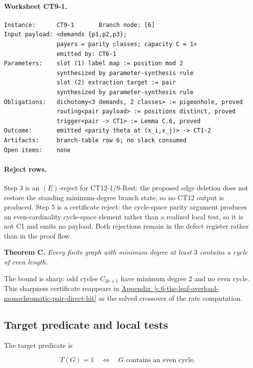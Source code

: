 \documentclass[
  11pt,
]{article}
\theoremstyle{definition}
\newcommand{\appref}[1]{\hyperref[#1]{Appendix~\ref*{#1}}}
\begin{document}
\paragraph{Worksheet CT9-1.}
\begingroup
\small
\begin{verbatim}
Instance:      CT9-1       Branch node: [6]
Input payload: <demands {p1,p2,p3};
               payers = parity classes; capacity C = 1>
               emitted by: CT6-1
Parameters:    slot (1) label map := position mod 2
               synthesized by parameter-synthesis rule
               slot (2) extraction target := pair
               synthesized by parameter-synthesis rule
Obligations:   dichotomy<3 demands, 2 classes> := pigeonhole, proved
               routing<pair payload> := positions distinct, proved
               trigger<pair -> CT1> := Lemma C.6, proved
Outcome:       emitted <parity theta at (x_i,x_j)> -> CT1-2
Artifacts:     branch-table row 6; no slack consumed
Open items:    none
\end{verbatim}
\endgroup

\paragraph{Reject rows.}
Step 3 is an \((E)\)-reject for CT12-1/S-Rest: the proposed edge deletion
does not restore the standing minimum-degree branch state, so no CT12
output is produced. Step 5 is a certificate reject: the cycle-space
parity argument produces an even-cardinality cycle-space element rather
than a realized local test, so it is not C1 and emits no payload. Both
rejections remain in the defect register rather than in the proof flow.

\textbf{Theorem C.} \emph{Every finite graph with minimum degree at
least \(3\) contains a cycle of even length.}

The bound is sharp: odd cycles \(C_{2k+1}\) have minimum degree \(2\)
and no even cycle. This sharpness certificate reappears in \appref{c.6-the-leaf-overload-monochromatic-pair-direct-hit}
as the solved crossover of the rate computation.

\subsection{Target predicate and local
tests}\label{c.1-target-predicate-and-local-tests}

The target predicate is

\[
T(G)=1
\quad\Longleftrightarrow\quad
G\text{ contains an even cycle}.
\]
\end{document}
